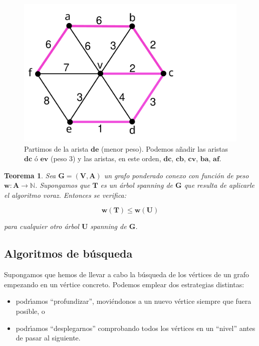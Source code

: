 \documentclass[ebook,oneside]{memoir}
\newtheorem{thm}{Teorema}[chapter]
\newcommand{\bolds}[1]{\boldsymbol{#1}}
\begin{document}
      \begin{center}
           \begin{figure}[h!]
           \includegraphics[scale=0.2]{ASM.pdf}
           \noindent Partimos de la arista $\bolds{de}$ (menor peso). Podemos a\~{n}adir las aristas $\bolds{dc}$ \'{o} $\bolds{ev}$ (peso 3)
           y las aristas, en este orden, $\bolds{dc}$, $\bolds{cb}$, $\bolds{cv}$, $\bolds{ba}$, $\bolds{af}$.
           \end{figure}
      \end{center}

\vspace{-2cm}
\begin{thm}
Sea $\bolds{G=(V,A)}$ un grafo ponderado conexo con funci\'{o}n de peso $\bolds{w:A\rightarrow\mathbb{N}}$. Supongamos que $\bolds{T}$ es un \'{a}rbol
spanning de $\bolds{G}$ que resulta de aplicarle el algoritmo voraz. Entonces se verifica:

        $$\bolds{w(T)\leq w(U)}$$

para cualquier otro \'{a}rbol $\bolds{U}$ spanning de $\bolds{G}$.
\end{thm}

\subsection{Algoritmos de b\'{u}squeda}

Supongamos que hemos de llevar a cabo la b\'{u}squeda de los v\'{e}rtices de un grafo em\-pe\-zan\-do en un v\'{e}rtice concreto.
Podemos emplear dos estrategias distintas:
        \begin{itemize}
            \item podr\'{\i}amos ``profundizar'', movi\'{e}ndonos a un nuevo v\'{e}rtice siempre que fuera posible, o
            \vspace{-0.2cm}
            \item podr\'{\i}amos ``desplegarnos'' comprobando todos los v\'{e}rtices en un ``nivel'' antes de pasar al siguiente.
        \end{itemize}
\end{document}
